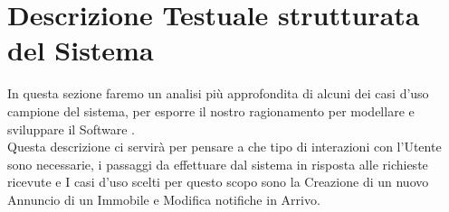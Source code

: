 \section{Descrizione Testuale strutturata del Sistema}
In questa sezione faremo un analisi più approfondita di alcuni dei casi d'uso campione del sistema, per esporre il nostro ragionamento per modellare e sviluppare il Software .\\
Questa descrizione ci servirà per pensare a che tipo di interazioni con l'Utente sono necessarie, i passaggi da effettuare  dal sistema in risposta alle richieste ricevute e 
I casi d'uso scelti per questo scopo sono la Creazione di un nuovo Annuncio di un Immobile e Modifica notifiche in Arrivo.
  

\newpage

\newpage

\newpage
